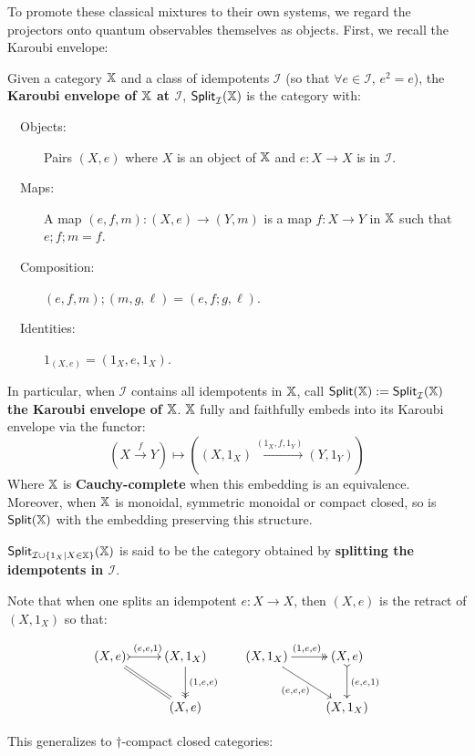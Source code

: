 To promote these classical mixtures to their own systems,  we regard the projectors onto quantum observables themselves as objects. First, we recall the Karoubi envelope:

\begin{definition}
Given a category $\mathbb{X}$ and a class of idempotents $\mathcal I$ (so that $\forall e\in \mathcal I$, $e^2=e$), the {\bf Karoubi envelope of $\mathbb{X}$ at $\mathcal{I}$}, ${\sf Split}_{\mathcal I}(\mathbb{X})$ is the category with:
\begin{description}
\item[\ \ Objects:] Pairs $(X,e)$ where $X$ is an object of $\mathbb{X}$ and $e:X\to X$ is in $\mathcal I$.
\item[\ \ Maps:] A map $(e,f,m):(X,e)\to (Y,m)$ is a map $f:X\to Y$ in $\mathbb{X}$ such that $e;f;m=f$.
\item[\ \ Composition:] $(e,f,m);(m,g,\ell) = (e,f;g,\ell)$.
\item[\ \ Identities:] $1_{(X,e)}=(1_X,e,1_X)$.
\end{description}


In particular, when $\mathcal{I}$ contains all idempotents in $\mathbb{X}$, call  ${\sf Split}(\mathbb{X}):={\sf Split}_{\mathcal I}(\mathbb{X})$ {\bf the Karoubi envelope of $\mathbb{X}$}.
$\mathbb{X}$ fully and faithfully embeds into its Karoubi envelope via the functor:
$$
\left(X\xrightarrow{f}Y\right)
\mapsto 
\left((X,1_X)\xrightarrow{(1_X,f,1_Y)}(Y,1_Y)\right)
$$
Where $\mathbb{X}$ is {\bf Cauchy-complete} when this embedding is an equivalence. 
Moreover, when $\mathbb{X}$ is monoidal, symmetric monoidal or compact closed, so is ${\sf Split}(\mathbb{X})$ with the embedding preserving this structure.


${\sf Split}_{{\mathcal I }\cup \{ 1_X | X \in \mathbb{X}\}}(\mathbb{X})$ is said to be the category obtained by {\bf splitting the idempotents in $\mathcal I$}.

Note that when one splits an idempotent $e:X\to X$, then $(X,e)$ is the retract of $(X, 1_X)$ so that:

$$
\xymatrix{
(X,e) \ar@{>->}[r]^{(e,e,1)} \ar@{=}[dr] & (X,1_X)  \ar@{->>}[d]^{(1,e,e)}\\
& (X,e)
}\, \hspace*{.5cm}
\xymatrix{
(X,1_X) \ar@{->>}[r]^{(1,e,e)} \ar[dr]_{(e,e,e)} & (X,e)  \ar@{>->}[d]^{(e,e,1)}\\
& (X,1_X)
}
$$




\end{definition}


This generalizes to $\dag$-compact closed categories:

